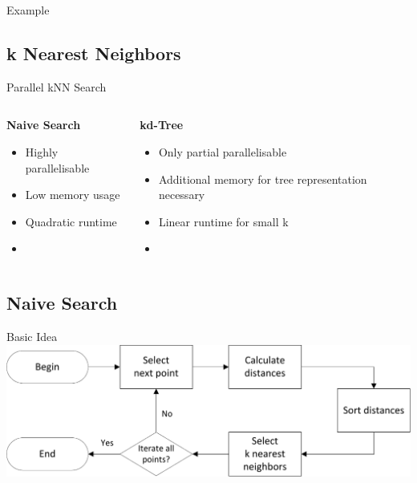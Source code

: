 \documentclass{beamer}
\begin{document}
\begin{frame}{Example}
\end{frame}

\subsection*{k Nearest Neighbors}

\begin{frame}{Parallel kNN Search}
	\begin{columns}[T]
		\begin{column}{0.5\textwidth}
			\textbf{Naive Search}
			\begin{itemize}
				\item Highly parallelisable
				\item Low memory usage
				\item Quadratic runtime
				\item 
			\end{itemize}
		\end{column}
		\begin{column}{0.5\textwidth}
			\textbf{kd-Tree}
			\begin{itemize}
				\item Only partial parallelisable
				\item Additional memory for tree representation necessary
				\item Linear runtime for small k
				\item 
			\end{itemize}
		\end{column}
	\end{columns}
\end{frame}

\subsection*{Naive Search}

\begin{frame}{Basic Idea}
	\includegraphics[width=1.0\textwidth]{knn_procedure.pdf}
\end{frame}
\end{document}
